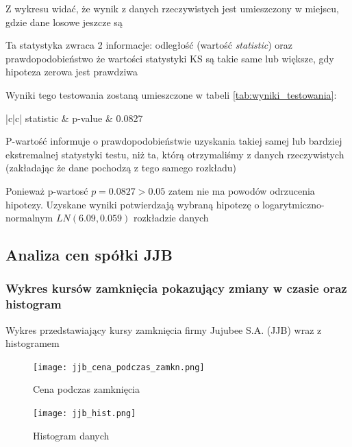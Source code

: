 \documentclass[a4paper,11pt]{article}
\def\\{\hfill\break}
\begin{document}
Z wykresu widać, że wynik z danych rzeczywistych jest umieszczony w miejscu, gdzie dane losowe jeszcze są



Ta statystyka zwraca 2 informacje: odległość (wartość \textit{statistic}) oraz prawdopodobieństwo że wartości statystyki KS są takie same lub większe, gdy hipoteza zerowa jest prawdziwa

Wyniki tego testowania zostaną umieszczone w tabeli \ref{tab:wyniki_testowania}:

\begin{table}[!htb]
  \centering
  \begin{tabular}{|c|c|}
    \hline
     statistic & p-value   \\
      & 0.0827\\
    \hline
  \end{tabular}
  \caption{Wartość statystyki KS w testowaniu hipotezy}
  \label{tab:wyniki_testowania}
\end{table}


P-wartość informuje o prawdopodobieństwie uzyskania takiej samej lub bardziej ekstremalnej statystyki testu, niż ta, którą otrzymaliśmy z danych rzeczywistych (zakładając że dane pochodzą z tego samego rozkładu)

Ponieważ p-wartosć  $p = 0.0827 > 0.05$ zatem nie ma powodów odrzucenia hipotezy. Uzyskane wyniki potwierdzają wybraną hipotezę  o logarytmiczno-normalnym $LN(6.09, 0.059)$ rozkładzie danych

\newpage
\subsection{Analiza cen spółki JJB}
\subsubsection{Wykres kursów zamknięcia pokazujący zmiany w czasie oraz histogram}

Wykres przedstawiający kursy zamknięcia firmy Jujubee S.A. (JJB) wraz z histogramem
\begin{figure}[h]
  \texttt{[image: jjb\_cena\_podczas\_zamkn.png]}
  \caption{Cena podczas zamknięcia}
  \label{fig:jjb_cena_podcaz_zamkn}
\end{figure}

 
\begin{figure}[!htb]
  \texttt{[image: jjb\_hist.png]}
  \caption{Histogram danych}
  \label{fig:jjb_histogram}
\end{figure}
 
\end{document}
